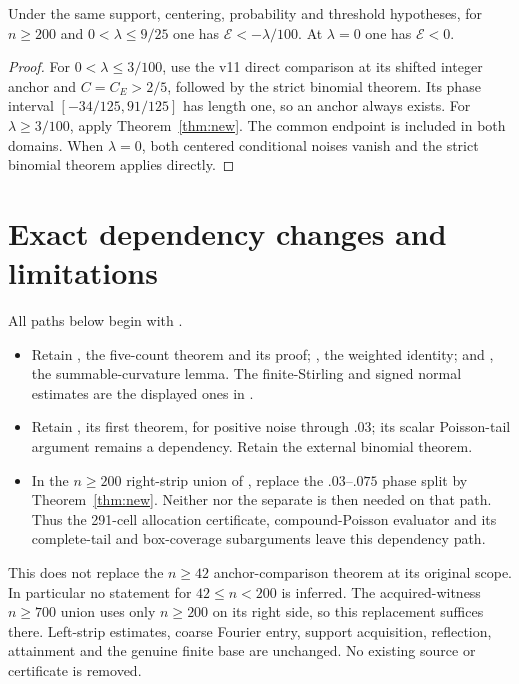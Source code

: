 \documentclass[11pt,a4paper]{article}
\begin{document}
\begin{corollary}\label{cor:union}
Under the same support, centering, probability and threshold hypotheses,
for $n\ge200$ and $0<\lambda\le9/25$ one has
$\mathcal E<-\lambda/100$. At $\lambda=0$ one has $\mathcal E<0$.
\end{corollary}
\begin{proof}
For $0<\lambda\le3/100$, use the v11 direct comparison at its shifted
integer anchor and $C=C_E>2/5$, followed by the strict binomial theorem.
Its phase interval $[-34/125,91/125]$ has length one, so an anchor always
exists. For $\lambda\ge3/100$, apply Theorem~\ref{thm:new}. The common
endpoint is included in both domains. When $\lambda=0$, both centered
conditional noises vanish and the strict binomial theorem applies directly.
\end{proof}

\section*{Exact dependency changes and limitations}
All paths below begin with .
\begin{itemize}
\item Retain , the
five-count theorem and its proof; ,
the weighted identity; and ,
the summable-curvature lemma. The finite-Stirling and signed normal estimates
are the displayed ones in .
\item Retain , its first
theorem, for positive noise through $.03$; its scalar Poisson-tail argument
remains a dependency. Retain the external binomial theorem.
\item In the $n\ge200$ right-strip union of
, replace the $.03$--$.075$
phase split by Theorem~\ref{thm:new}. Neither
 nor the separate
 is then needed on that path.
Thus the 291-cell allocation certificate, compound-Poisson evaluator and
its complete-tail and box-coverage subarguments leave this dependency path.
\end{itemize}
This does not replace the $n\ge42$ anchor-comparison theorem at its original
scope. In particular no statement for $42\le n<200$ is inferred. The
acquired-witness $n\ge700$ union uses only $n\ge200$ on its right side, so
this replacement suffices there. Left-strip estimates, coarse Fourier entry,
support acquisition, reflection, attainment and the genuine finite base are
unchanged. No existing source or certificate is removed.
\end{document}
